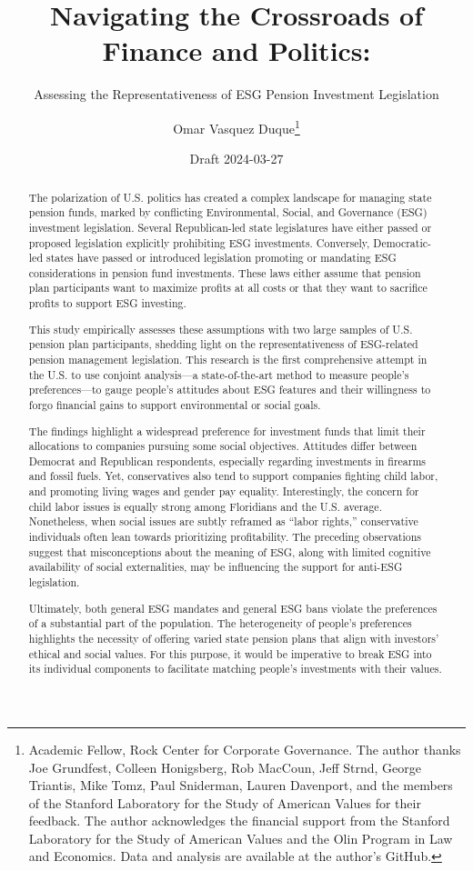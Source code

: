 \documentclass[
  12pt,
]{article}
\title{Navigating the Crossroads of Finance and Politics:}
\subtitle{Assessing the Representativeness of ESG Pension Investment Legislation}
\author{Omar Vasquez Duque\footnote{Academic Fellow, Rock Center for Corporate Governance. The author thanks Joe Grundfest, Colleen Honigsberg, Rob MacCoun, Jeff Strnd, George Triantis, Mike Tomz, Paul Sniderman, Lauren Davenport, and the members of the Stanford Laboratory for the Study of American Values for their feedback. The author acknowledges the financial support from the Stanford Laboratory for the Study of American Values and the Olin Program in Law and Economics. Data and analysis are available at the author's GitHub.}}
\date{Draft 2024-03-27}
\begin{document}
\maketitle
\begin{abstract}
\fontsize{10pt}{11.5pt}\selectfont

The polarization of U.S. politics has created a complex landscape for managing state pension funds, marked by conflicting Environmental, Social, and Governance (ESG) investment legislation. Several Republican-led state legislatures have either passed or proposed legislation explicitly prohibiting ESG investments. Conversely, Democratic-led states have passed or introduced legislation promoting or mandating ESG considerations in pension fund investments. These laws either assume that pension plan participants want to maximize profits at all costs or that they want to sacrifice profits to support ESG investing.

This study empirically assesses these assumptions with two large samples of U.S. pension plan participants, shedding light on the representativeness of ESG-related pension management legislation. This research is the first comprehensive attempt in the U.S. to use conjoint analysis---a state-of-the-art method to measure people's preferences---to gauge people's attitudes about ESG features and their willingness to forgo financial gains to support environmental or social goals.

The findings highlight a widespread preference for investment funds that limit their allocations to companies pursuing some social objectives. Attitudes differ between Democrat and Republican respondents, especially regarding investments in firearms and fossil fuels. Yet, conservatives also tend to support companies fighting child labor, and promoting living wages and gender pay equality. Interestingly, the concern for child labor issues is equally strong among Floridians and the U.S. average. Nonetheless, when social issues are subtly reframed as ``labor rights,'' conservative individuals often lean towards prioritizing profitability. The preceding observations suggest that misconceptions about the meaning of ESG, along with limited cognitive availability of social externalities, may be influencing the support for anti-ESG legislation.

Ultimately, both general ESG mandates and general ESG bans violate the preferences of a substantial part of the population. The heterogeneity of people's preferences highlights the necessity of offering varied state pension plans that align with investors' ethical and social values. For this purpose, it would be imperative to break ESG into its individual components to facilitate matching people's investments with their values.
\end{abstract}
\end{document}
